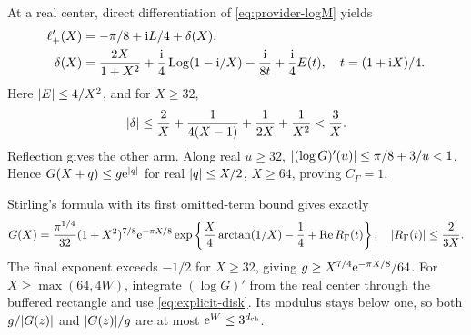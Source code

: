 At a real center, direct differentiation of
\eqref{eq:provider-logM} yields
\begin{align*}
 \ell_+'(X)&=-\pi/8+\mathrm i L/4+\delta(X),\\
 \delta(X)&=\frac{2X}{1+X^2}+\frac{\mathrm i}4\operatorname{Log}(1-\mathrm i/X)
             -\frac{\mathrm i}{8t}+\frac{\mathrm i}4E(t),\quad t=(1+\mathrm i X)/4.
\end{align*}
Here \(\lvert E\rvert\le4/X^2\), and for \(X\ge32\),
\begin{equation}
 \lvert \delta\rvert\le\frac2X+\frac1{4(X-1)}+
                  \frac1{2X}+\frac1{X^2}<\frac3X.
 \label{eq:explicit-slope}
\end{equation}
Reflection gives the other arm. Along real \(u\ge32\),
\(\lvert (\log G)'(u)\rvert\le\pi/8+3/u<1\). Hence
\(G(X+q)\le g\mathrm e^{\lvert q\rvert}\) for real \(\lvert q\rvert\le X/2\),
\(X\ge64\), proving \(C_\Gamma=1\).

Stirling's formula with its first omitted-term bound gives exactly
\begin{equation}
 G(X)=\frac{\pi^{1/4}}{32}(1+X^2)^{7/8}\mathrm e^{-\pi X/8}
  \exp\left\{\frac X4\arctan(1/X)-\frac14+\operatorname{Re} R_\Gamma(t)\right\},
 \quad\lvert R_\Gamma(t)\rvert\le\frac2{3X}.
 \label{eq:exact-real-gamma-calibration}
\end{equation}
The final exponent exceeds \(-1/2\) for \(X\ge32\), giving
\(g\ge X^{7/4}\mathrm e^{-\pi X/8}/64\).
For \(X\ge\max(64,4W)\), integrate \((\log G)'\) from the real
center through the buffered rectangle and use \eqref{eq:explicit-disk}.
Its modulus stays below one, so both
\(g/\lvert G(z)\rvert\) and \(\lvert G(z)\rvert/g\) are at most
\(\mathrm e^W\le3^{d_{\rm ch}}\).

